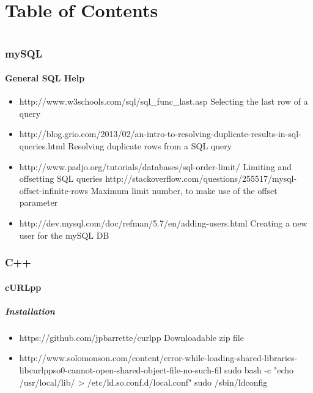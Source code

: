 \documentclass[12pt]{article}
\begin{document}
\part*{Table of Contents}
\tableofcontents
\pagebreak
\part*{}
\section{mySQL}
	\subsection{General SQL Help}
		\begin{itemize}
			\item http://www.w3schools.com/sql/sql\_func\_last.asp
			\subitem Selecting the last row of a query
			\item http://blog.grio.com/2013/02/an-intro-to-resolving-duplicate-results-in-sql-queries.html
			\subitem Resolving duplicate rows from a SQL query
			\item http://www.padjo.org/tutorials/databases/sql-order-limit/
			\subitem Limiting and offsetting SQL queries
			\subitem http://stackoverflow.com/questions/255517/mysql-offset-infinite-rows
			\subsubitem Maximum limit number, to make use of the offset parameter
			\item http://dev.mysql.com/doc/refman/5.7/en/adding-users.html
			\subitem Creating a new user for the mySQL DB
		\end{itemize}
\section{C++}
	\subsection{cURLpp}
	\subsubsection{Installation}
	\begin{itemize}
		\item https://github.com/jpbarrette/curlpp
		\subitem Downloadable zip file
		\item http://www.solomonson.com/content/error-while-loading-shared-libraries-libcurlppso0-cannot-open-shared-object-file-no-such-fil
		\subitem sudo bash -c "echo /usr/local/lib/ > /etc/ld.so.conf.d/local.conf"
		\subitem sudo /sbin/ldconfig
		\end{itemize}
\end{document}
